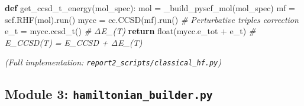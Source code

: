 \documentclass[
  11pt,
]{report}
\newenvironment{Shaded}{}{}
\newcommand{\BuiltInTok}[1]{\textcolor[rgb]{0.00,0.50,0.00}{#1}}
\newcommand{\CommentTok}[1]{\textcolor[rgb]{0.38,0.63,0.69}{\textit{#1}}}
\newcommand{\ControlFlowTok}[1]{\textcolor[rgb]{0.00,0.44,0.13}{\textbf{#1}}}
\newcommand{\KeywordTok}[1]{\textcolor[rgb]{0.00,0.44,0.13}{\textbf{#1}}}
\newcommand{\NormalTok}[1]{#1}
\newcommand{\OperatorTok}[1]{\textcolor[rgb]{0.40,0.40,0.40}{#1}}
\begin{document}
\begin{Shaded}
\begin{Highlighting}[]
\KeywordTok{def}\NormalTok{ get\_ccsd\_t\_energy(mol\_spec):}
\NormalTok{    mol }\OperatorTok{=}\NormalTok{ \_build\_pyscf\_mol(mol\_spec)}
\NormalTok{    mf }\OperatorTok{=}\NormalTok{ scf.RHF(mol).run()}
\NormalTok{    mycc }\OperatorTok{=}\NormalTok{ cc.CCSD(mf).run()}
    \CommentTok{\# Perturbative triples correction}
\NormalTok{    e\_t }\OperatorTok{=}\NormalTok{ mycc.ccsd\_t()            }\CommentTok{\# ΔE\_(T)}
    \ControlFlowTok{return} \BuiltInTok{float}\NormalTok{(mycc.e\_tot }\OperatorTok{+}\NormalTok{ e\_t)  }\CommentTok{\# E\_CCSD(T) = E\_CCSD + ΔE\_(T)}
\end{Highlighting}
\end{Shaded}

\emph{(Full implementation: \texttt{report2\_scripts/classical\_hf.py})}

\subsection{\texorpdfstring{Module 3:
\texttt{hamiltonian\_builder.py}}{Module 3: hamiltonian\_builder.py}}\label{module-3-hamiltonian_builder.py}
\end{document}
